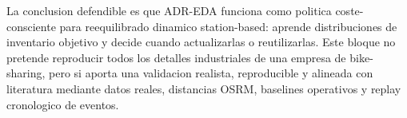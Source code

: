 La conclusion defendible es que ADR-EDA funciona como politica coste-consciente para reequilibrado dinamico station-based: aprende distribuciones de inventario objetivo y decide cuando actualizarlas o reutilizarlas. Este bloque no pretende reproducir todos los detalles industriales de una empresa de bike-sharing, pero si aporta una validacion realista, reproducible y alineada con literatura mediante datos reales, distancias OSRM, baselines operativos y replay cronologico de eventos.
